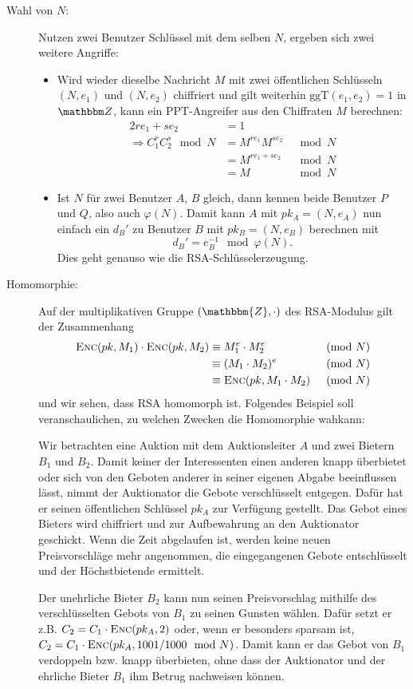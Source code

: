 \begin{description}
\item[Wahl von $N$:] 
  Nutzen zwei Benutzer Schlüssel mit dem selben $N$, ergeben sich zwei
  weitere Angriffe:
  \begin{itemize}
  \item Wird wieder dieselbe Nachricht $M$ mit zwei
    öffentlichen Schlüsseln $(N, e_1)$ und $(N, e_2)$ chiffriert und
    gilt weiterhin $\text{ggT}(e_1, e_2) = 1$ in $\Z{}$, kann ein
    PPT-Angreifer aus den Chiffraten $M$ berechnen:
    \begin{alignat*}{2}
      re_1 + se_2 & = 1\\ 
      \Longrightarrow C_1^rC_2^s \mod N &= M^{re_1}M^{se_2} &\mod N\\
                  &= M^{re_1 + se_2} &\mod N\\
                  &= M &\mod N
    \end{alignat*}
  \item
    Ist $N$ für zwei Benutzer $A$, $B$ gleich, dann kennen beide Benutzer $P$ und
    $Q$, also auch $\varphi(N)$. Damit kann $A$ mit $pk_A = (N, e_A)$
    nun einfach ein $d_B'$ zu Benutzer $B$ mit $pk_B = (N, e_B)$
    berechnen mit 
    \[d_B'=e_B^{-1} \mod \varphi(N).\]
    Dies geht genauso wie die RSA-Schlüsselerzeugung.
  \end{itemize}    
\item[Homomorphie:] Auf der multiplikativen Gruppe $(\mathbbm{Z}, \cdot)$ des RSA-Modulus gilt der Zusammenhang
  \begin{alignat*}{2}
      \textsc{Enc}(pk, M_1) \cdot \textsc{Enc}(pk, M_2) &\equiv M_1^e \cdot M_2^e &
      \pmod N \\
      &\equiv (M_1 \cdot M_2)^e & \pmod N\\
      &\equiv \textsc{Enc}(pk, M_1 \cdot M_2) & \pmod N
  \end{alignat*}
  und wir sehen, dass RSA homomorph ist. 
  Folgendes Beispiel soll veranschaulichen, zu welchen Zwecken die Homomorphie wahkann:   
    \begin{beispiel}
    	Wir betrachten eine Auktion mit dem Auktionsleiter $A$ und zwei Bietern $B_1$ und $B_2$. Damit keiner der Interessenten einen
    	anderen knapp überbietet oder sich von den Geboten anderer in seiner eigenen Abgabe beeinflussen lässt, nimmt der Auktionator die Gebote verschlüsselt entgegen. Dafür hat er seinen öffentlichen Schlüssel $pk_A$ zur Verfügung gestellt. Das Gebot eines Bieters wird chiffriert und zur Aufbewahrung an den Auktionator geschickt. Wenn die Zeit abgelaufen ist, werden keine neuen Preisvorschläge mehr angenommen, die eingegangenen Gebote entschlüsselt und der Höchstbietende ermittelt.
    
    	Der unehrliche Bieter $B_2$ kann nun seinen Preisvorschlag mithilfe des verschlüsselten Gebots von $B_1$ zu seinen Gunsten wählen. Dafür setzt er z.B. $C_2 =
    	C_1 \cdot \textsc{Enc}({pk_A, 2})$ oder, wenn er besonders sparsam ist, $C_2 = C_1 \cdot \textsc{Enc}({pk_A, 1001/1000 \mod N})$. Damit kann er das Gebot von $B_1$ verdoppeln
    	bzw. knapp überbieten, ohne dass der Auktionator und der ehrliche Bieter $B_1$ ihm Betrug nachweisen können.
    \end{beispiel}
\end{description} 

